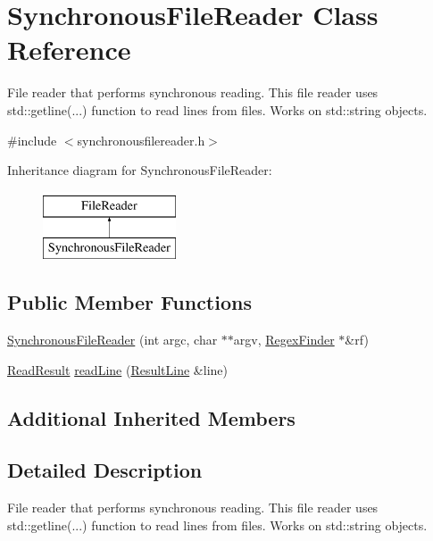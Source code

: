 \hypertarget{class_synchronous_file_reader}{\section{Synchronous\-File\-Reader Class Reference}
\label{class_synchronous_file_reader}
}


File reader that performs synchronous reading. This file reader uses std\-::getline(...) function to read lines from files. Works on std\-::string objects.  




{\ttfamily \#include $<$synchronousfilereader.\-h$>$}

Inheritance diagram for Synchronous\-File\-Reader\-:\begin{figure}[H]
\begin{center}
\leavevmode
\includegraphics[height=2.000000cm]{class_synchronous_file_reader}
\end{center}
\end{figure}
\subsection*{Public Member Functions}
\begin{DoxyCompactItemize}
\item 
\hyperlink{class_synchronous_file_reader_aa7b42b73bed91bf9dbe69c1d9779ca6f}{Synchronous\-File\-Reader} (int argc, char $\ast$$\ast$argv, \hyperlink{class_regex_finder}{Regex\-Finder} $\ast$\&rf)
\item 
\hyperlink{class_file_reader_a8e801198c62f657dd1dff8fd8dbe796f}{Read\-Result} \hyperlink{class_synchronous_file_reader_a03ea3c5e6bd283b4a98b244edf2bd424}{read\-Line} (\hyperlink{class_result_line}{Result\-Line} \&line)
\end{DoxyCompactItemize}
\subsection*{Additional Inherited Members}


\subsection{Detailed Description}
File reader that performs synchronous reading. This file reader uses std\-::getline(...) function to read lines from files. Works on std\-::string objects. 

